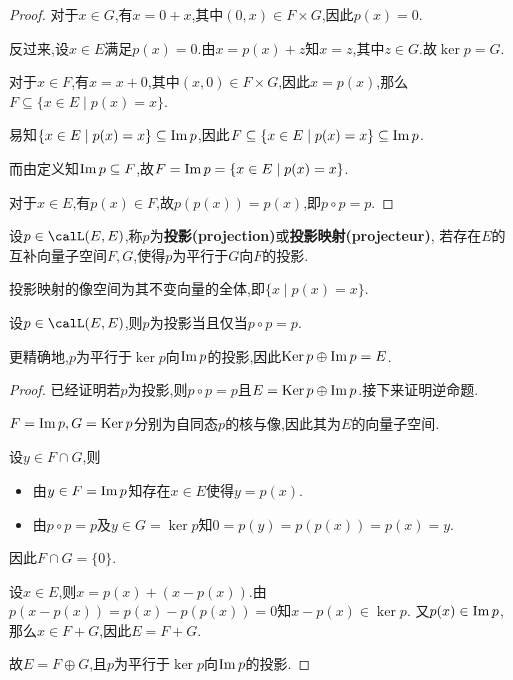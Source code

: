 \begin{proof}
    对于$x \in G$,有$x = 0 + x$,其中$(0, x) \in F \times G$,因此$p(x) = 0$.

    反过来,设$x \in E$满足$p(x) = 0$.由$x = p(x) + z$知$x = z$,其中$z \in G$.故$\ker p = G$.

    对于$x \in F$,有$x = x + 0$,其中$(x, 0) \in F \times G$,因此$x = p(x)$,那么$F \subseteq \{ x \in E \mid p(x) = x \}$.

    易知$\{ x \in E \mid p(x) = x \} \subseteq \operatorname{Im} p$,因此$F \subseteq \{ x \in E \mid p(x) = x \} \subseteq \operatorname{Im} p$.

    而由定义知$\operatorname{Im} p \subseteq F$,故$F = \operatorname{Im} p = \{ x \in E \mid p(x) = x \}$.

    对于$x \in E$,有$p(x) \in F$,故$p(p(x)) = p(x)$,即$p \circ p = p$.
\end{proof}

\begin{deff}
    设$p \in \calL(E, E)$,称$p$为\textbf{投影(projection)}或\textbf{投影映射(projecteur)},
    若存在$E$的互补向量子空间$F, G$,使得$p$为平行于$G$向$F$的投影.
\end{deff}

\begin{rqq}
    投影映射的像空间为其不变向量的全体,即$\{ x \mid p(x) = x \}$.
\end{rqq}

\begin{prop}
    设$p \in \calL(E, E)$,则$p$为投影当且仅当$p \circ p = p$.

    更精确地,$p$为平行于$\ker p$向$\operatorname{Im} p$的投影,因此$\operatorname{Ker} p \oplus \operatorname{Im} p = E$.
\end{prop}

\begin{proof}
    已经证明若$p$为投影,则$p \circ p = p$且$E = \operatorname{Ker} p \oplus \operatorname{Im} p$.接下来证明逆命题.

    $F = \operatorname{Im} p, G = \operatorname{Ker} p$分别为自同态$p$的核与像,因此其为$E$的向量子空间.

    设$y \in F \cap G$,则
    
    \begin{itemize}
        \item 由$y \in F = \operatorname{Im} p$知存在$x \in E$使得$y = p(x)$.
        \item 由$p \circ p = p$及$y \in G = \ker p$知$0 = p(y) = p(p(x)) = p(x) = y$.
    \end{itemize}

    因此$F \cap G = \{ 0 \}$.

    设$x \in E$,则$x = p(x) + (x - p(x))$.由$p(x - p(x)) = p(x) - p(p(x)) = 0$知$x - p(x) \in \ker p$.
    又$p(x) \in \operatorname{Im} p$,那么$x \in F + G$,因此$E = F + G$.

    故$E = F \oplus G$,且$p$为平行于$\ker p$向$\operatorname{Im} p$的投影.
\end{proof}

